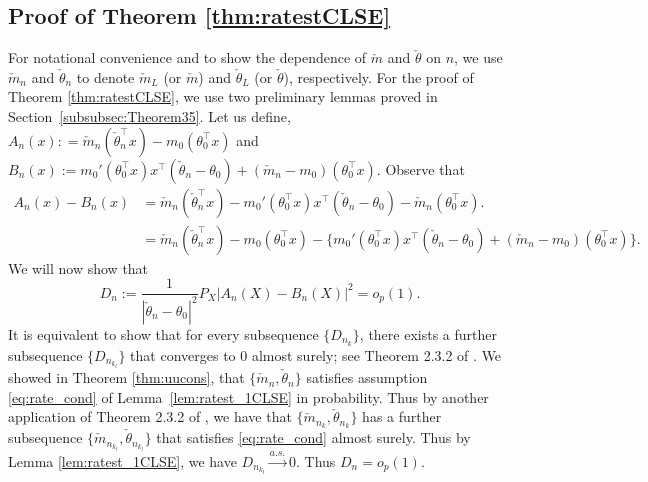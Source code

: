 \subsection{Proof of Theorem \ref{thm:ratestCLSE}} \label{sec:proof_ratestPLSE}
For notational convenience and to show the dependence of $\check{m}$ and $\check{\theta}$ on $n$, we use $\check{m}_{n}$ and $\check{\theta}_n$ to denote $\check{m}_{{L}}$  (or $\check{m}$) and $\check{\theta}_{{L}}$ (or $\check{\theta}$), respectively. For the proof of Theorem \ref{thm:ratestCLSE}, we use two preliminary lemmas proved in Section~\ref{subsubsec:Theorem35}. Let us define, $A_n(x): =\check{m}_n(\check{\theta}_n^{\top}x) - m_0(\theta_0^{\top}x)$ and $B_n(x):=m_0'(\theta_0^{\top}x)x^{\top}(\check{\theta}_n - \theta_0) + (\check{m}_n - m_0)(\theta_0^{\top}x).$ Observe that
\begin{align*}
A_n(x)-B_n(x)&=\check{m}_n(\check{\theta}_n^{\top}x) -m_0'(\theta_0^{\top}x)x^{\top}(\check{\theta}_n - \theta_0) - \check{m}_n(\theta_0^{\top}x).\\
&=\check{m}_n(\check\theta_n^{\top}x)   - m_0(\theta_0^{\top}x) - \{m_0'(\theta_0^{\top}x)x^{\top}(\check\theta_n - \theta_0) + (\check{m}_n-m_0)(\theta_0^{\top}x)\}.
\end{align*}
We will now show that
\begin{equation}\label{eq:rate_prob}
D_n:=\frac{1}{|\check{\theta}_{n} -\theta_0|^2} P_X|A_{n}(X)-B_{n}(X)|^2=o_p(1).
\end{equation}
It is equivalent to show that for every subsequence $\{D_{n_{k}}\}$, there exists a further subsequence  $\{D_{n_{k_l}}\}$ that converges to 0 almost surely; see Theorem 2.3.2 of \cite{Durrett}.
We showed in Theorem \ref{thm:uucons}, that $\{\check{m}_n, \check{\theta}_n\}$ satisfies assumption \eqref{eq:rate_cond} of Lemma~\ref{lem:ratest_1CLSE} in probability. Thus by  another application of Theorem 2.3.2 of \cite{Durrett}, we have that $\{\check{m}_{n_k}, \check{\theta}_{n_k}\}$ has a further subsequence $\{\check{m}_{n_{k_l}}, \check{\theta}_{n_{k_l}}\}$ that satisfies \eqref{eq:rate_cond} almost surely. Thus by Lemma \ref{lem:ratest_1CLSE}, we have
$D_{n_{k_l}}\stackrel{a.s.}{\rightarrow} 0.$ Thus $D_n=o_p(1).$

